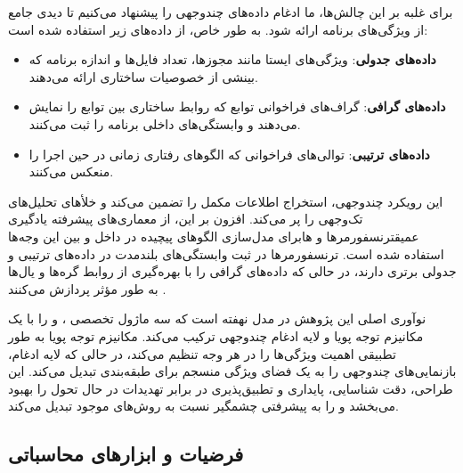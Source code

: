 برای غلبه بر این چالش‌ها، ما ادغام داده‌های چندوجهی را پیشنهاد می‌کنیم تا دیدی جامع از ویژگی‌های برنامه ارائه شود. به طور خاص، از داده‌های زیر استفاده شده است:
\begin{itemize}
    \renewcommand{\labelitemi}{\lr{$\bullet$}}
    \item \textbf{داده‌های جدولی}: ویژگی‌های ایستا مانند مجوزها، تعداد فایل‌ها و اندازه برنامه که بینشی از خصوصیات ساختاری ارائه می‌دهند.
    \item \textbf{داده‌های گرافی}: گراف‌های فراخوانی توابع که روابط ساختاری بین توابع را نمایش می‌دهند و وابستگی‌های داخلی برنامه را ثبت می‌کنند.
    \item \textbf{داده‌های ترتیبی}: توالی‌های فراخوانی  که الگوهای رفتاری زمانی در حین اجرا را منعکس می‌کنند.
\end{itemize}
این رویکرد چندوجهی، استخراج اطلاعات مکمل را تضمین می‌کند و خلأهای تحلیل‌های تک‌وجهی را پر می‌کند. افزون بر این، از معماری‌های پیشرفته یادگیری عمیقترنسفورمرها و  هابرای مدل‌سازی الگوهای پیچیده در داخل و بین این وجه‌ها استفاده شده است. ترنسفورمرها در ثبت وابستگی‌های بلندمدت در داده‌های ترتیبی و جدولی برتری دارند، در حالی که  داده‌های گرافی را با بهره‌گیری از روابط گره‌ها و یال‌ها به طور مؤثر پردازش می‌کنند \cite{attention, Kipf2017}.

نوآوری اصلی این پژوهش در مدل \textbf{} نهفته است که سه ماژول تخصصی \textit{}، \textit{} و \textit{}را با یک مکانیزم توجه پویا و لایه ادغام چندوجهی ترکیب می‌کند. مکانیزم توجه پویا به طور تطبیقی اهمیت ویژگی‌ها را در هر وجه تنظیم می‌کند، در حالی که لایه ادغام، بازنمایی‌های چندوجهی را به یک فضای ویژگی منسجم برای طبقه‌بندی تبدیل می‌کند. این طراحی، دقت شناسایی، پایداری و تطبیق‌پذیری در برابر تهدیدات در حال تحول را بهبود می‌بخشد و  را به پیشرفتی چشمگیر نسبت به روش‌های موجود تبدیل می‌کند.

\subsection{فرضیات و ابزارهای محاسباتی}

